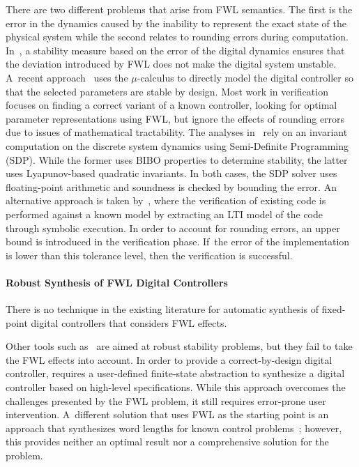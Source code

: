 \documentclass[final]{sig-alternate-05-2015}
\begin{document}
There are two different problems that arise from FWL semantics.  The first
is the error in the dynamics caused by the inability to represent the exact
state of the physical system while the second relates to rounding errors
during computation.  In~\cite{fialho1994stability}, a stability measure
based on the error of the digital dynamics ensures that the deviation
introduced by FWL does not make the digital system unstable.  A~recent
approach~\cite{DBLP:journals/automatica/WuLCC09} uses the $\mu$-calculus to
directly model the digital controller so that the selected parameters are
stable by design.  Most work in verification focuses on finding a correct
variant of a known controller, looking for optimal parameter
representations using FWL, but ignore the effects of rounding errors due to
issues of mathematical tractability.  The analyses
in~\cite{DBLP:conf/hybrid/RouxJG15,DBLP:conf/hybrid/WangGRJF16} rely on an
invariant computation on the discrete system dynamics using Semi-Definite
Programming (SDP).  While the former uses BIBO properties to determine
stability, the latter uses Lyapunov-based quadratic invariants.  In both
cases, the SDP solver uses floating-point arithmetic and soundness is
checked by bounding the error.  An alternative approach is taken
by~\cite{park2016scalable}, where the verification of existing code is
performed against a known model by extracting an LTI model of the code
through symbolic execution.  In order to account for rounding errors, an
upper bound is introduced in the verification phase.  If~the error of the
implementation is lower than this tolerance level, then the verification is
successful.

\paragraph{Robust Synthesis of FWL Digital Controllers}

There is no technique in the existing literature for automatic synthesis of
fixed-point digital controllers that considers FWL effects.

Other tools such as~\cite{economakos2016automated} are aimed at
robust stability problems, but they fail to take the FWL effects into
account.  In order to provide a correct-by-design digital controller,
\cite{alur2016compositional} requires a user-defined finite-state
abstraction to synthesize a digital controller based on high-level
specifications.  While this approach overcomes the challenges presented by
the FWL problem, it still requires error-prone user intervention. 
A~different solution that uses FWL as the starting point is an approach that
synthesizes word lengths for known control problems~\cite{jha2013swati};
however, this provides neither an optimal result nor a comprehensive
solution for the problem.
\end{document}
